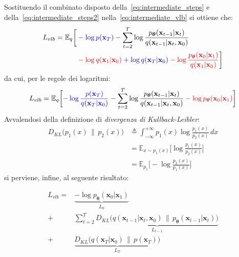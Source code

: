 Sostituendo il combinato disposto della~\eqref{eq:intermediate_steps} e della~\eqref{eq:intermediate_steps2} nella~\eqref{eq:intermediate_vlb} si ottiene che:
\begin{equation}
    \begin{split}
    L_{vlb}=\mathbb{E}_q\biggl[
        &\mathcolor{blue}{-\log p(\mathbf{x}_T)}-
           \sum_{t=2}^T\log\frac{p_{\bm{\theta}}(\mathbf{x}_{t-1}|\mathbf{x}_t)}{q(\mathbf{x}_{t-1}|\mathbf{x}_t,\mathbf{x}_0)}\\
        &\mathcolor{red}{-\log q(\mathbf{x}_1|\mathbf{x}_0)}\mathcolor{blue}{+\log q (\mathbf{x}_T|\mathbf{x}_0)}
        \mathcolor{red}{-\log\frac{p_{\bm{\theta}}(\mathbf{x}_0|\mathbf{x}_1)}{q(\mathbf{x}_1|\mathbf{x}_0)}}\biggr]
    \end{split}
\end{equation}
da cui, per le regole dei logaritmi:
\begin{equation}
    L_{vlb}=\mathbb{E}_q\biggl[\mathcolor{blue}{-\log \frac{p(\mathbf{x}_T)}{q(\mathbf{x}_T|\mathbf{x}_0)}}
    -\sum_{t=2}^T\log\frac{p_{\bm{\theta}}(\mathbf{x}_{t-1}|\mathbf{x}_t)}{q(\mathbf{x}_{t-1}|\mathbf{x}_t,\mathbf{x}_0)}
    \mathcolor{red}{-\log p_{\bm{\theta}}(\mathbf{x}_0|\mathbf{x}_1)}\biggr]
\end{equation}
Avvalendosi della definizione di \emph{divergenza di Kullback-Leibler}:
\begin{equation}
    \begin{split}
    D_{KL}\bigl(p_1(x)\,\|\,p_2(x)\bigr)
    &\triangleq\int_{-\infty}^{+\infty} p_1(x)\log\frac{p_1(x)}{p_2(x)}\,dx\\
    &=\mathbb{E}_{x\sim p_1(x)}\biggl[\log\frac{p_1(x)}{p_2(x)}\biggr] \\
    &=  \mathbb{E}_{p_1}\biggl[-\log\frac{p_2(x)}{p_1(x)}\biggr]  \label{eq:kullback-leibler}
    \end{split}
\end{equation}
si perviene, infine, al seguente risultato:
\begin{Mybox2}
\begin{equation}
    \begin{split}
    L_{vlb}= &\underbrace{-\log p_{\bm{\theta}}(\mathbf{x}_0|\mathbf{x}_1)}_{L_0}\\
    +&\sum_{t=2}^T \underbrace{D_{KL}\bigl(q(\mathbf{x}_{t-1}|\mathbf{x}_t,\mathbf{x}_0)\,\|\,p_{\bm{\theta}}(\mathbf{x}_{t-1}|\mathbf{x}_t)\bigr)}_{L_{t-1}}\\
    +&\underbrace{D_{KL}\bigl(q(\mathbf{x}_T|\mathbf{x}_0)\,\|\,p(\mathbf{x}_T)\bigr)}_{L_T}\label{eq:final_lvlb}
\end{split}
\end{equation}
\end{Mybox2}


